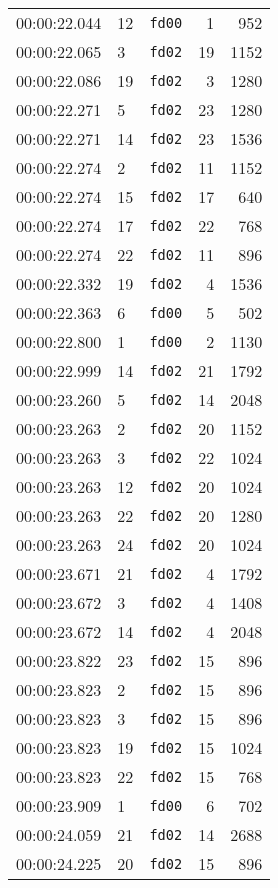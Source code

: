 \documentclass{article}
\begin{document}
\begin{longtable}{lllrr}
00:00:22.044 & 12 & \texttt{fd00} & 1 & 952 \\
00:00:22.065 & 3 & \texttt{fd02} & 19 & 1152 \\
00:00:22.086 & 19 & \texttt{fd02} & 3 & 1280 \\
00:00:22.271 & 5 & \texttt{fd02} & 23 & 1280 \\
00:00:22.271 & 14 & \texttt{fd02} & 23 & 1536 \\
00:00:22.274 & 2 & \texttt{fd02} & 11 & 1152 \\
00:00:22.274 & 15 & \texttt{fd02} & 17 & 640 \\
00:00:22.274 & 17 & \texttt{fd02} & 22 & 768 \\
00:00:22.274 & 22 & \texttt{fd02} & 11 & 896 \\
00:00:22.332 & 19 & \texttt{fd02} & 4 & 1536 \\
00:00:22.363 & 6 & \texttt{fd00} & 5 & 502 \\
00:00:22.800 & 1 & \texttt{fd00} & 2 & 1130 \\
00:00:22.999 & 14 & \texttt{fd02} & 21 & 1792 \\
00:00:23.260 & 5 & \texttt{fd02} & 14 & 2048 \\
00:00:23.263 & 2 & \texttt{fd02} & 20 & 1152 \\
00:00:23.263 & 3 & \texttt{fd02} & 22 & 1024 \\
00:00:23.263 & 12 & \texttt{fd02} & 20 & 1024 \\
00:00:23.263 & 22 & \texttt{fd02} & 20 & 1280 \\
00:00:23.263 & 24 & \texttt{fd02} & 20 & 1024 \\
00:00:23.671 & 21 & \texttt{fd02} & 4 & 1792 \\
00:00:23.672 & 3 & \texttt{fd02} & 4 & 1408 \\
00:00:23.672 & 14 & \texttt{fd02} & 4 & 2048 \\
00:00:23.822 & 23 & \texttt{fd02} & 15 & 896 \\
00:00:23.823 & 2 & \texttt{fd02} & 15 & 896 \\
00:00:23.823 & 3 & \texttt{fd02} & 15 & 896 \\
00:00:23.823 & 19 & \texttt{fd02} & 15 & 1024 \\
00:00:23.823 & 22 & \texttt{fd02} & 15 & 768 \\
00:00:23.909 & 1 & \texttt{fd00} & 6 & 702 \\
00:00:24.059 & 21 & \texttt{fd02} & 14 & 2688 \\
00:00:24.225 & 20 & \texttt{fd02} & 15 & 896 \\

\end{longtable}
\end{document}
